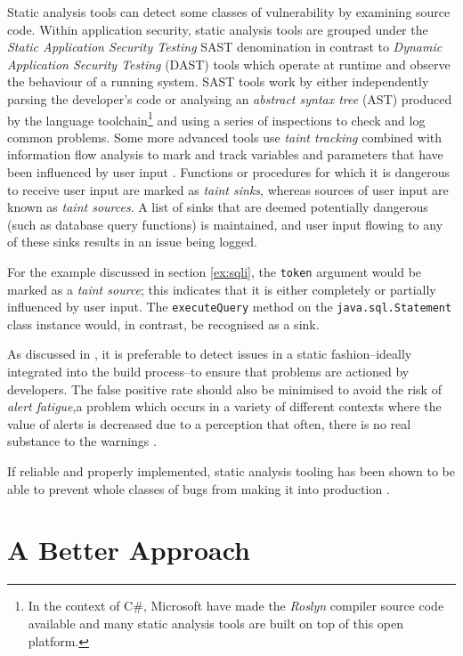 \documentclass[a4paper,openany,12pt]{book}
\begin{document}
Static analysis tools can detect some classes of vulnerability by examining source code.
Within application security, static analysis tools are grouped under the \emph{Static Application Security Testing} SAST
denomination in contrast to \emph{Dynamic Application Security Testing} (DAST) tools which operate at runtime and
observe the behaviour of a running system.
SAST tools work by either independently parsing the developer's code or
analysing an \emph{abstract syntax tree} (AST) produced by the language toolchain\footnote{%
    In the context of C\#, Microsoft have made the \emph{Roslyn} compiler source code available and many static analysis
    tools are built on top of this open platform.}
and using a series of inspections to check and log common problems.
Some more advanced tools use \emph{taint tracking} combined with information flow analysis to mark and track variables
and parameters that have been influenced by user input \citep{denning1977certification}.
Functions or procedures for which it is dangerous to receive user input are marked as \emph{taint sinks}, whereas
sources of user input are known as \emph{taint sources}.
A list of sinks that are deemed potentially dangerous (such as database query functions) is maintained, and user input
flowing to any of these sinks results in an issue being logged.

For the example discussed in section \ref{ex:sqli}, the \texttt{token} argument would be marked as a
\emph{taint source}; this indicates that it is either completely or partially influenced by user input.
The \texttt{executeQuery} method on the \texttt{java.sql.Statement} class instance would, in contrast, be recognised
as a sink.

As discussed in \citet{sadowski2018lessons}, it is preferable to detect issues in a static fashion--ideally integrated
into the build process--to ensure that problems are actioned by developers.
The false positive rate should also be minimised to avoid the risk of \emph{alert fatigue},a problem which occurs in a
variety of different contexts where the value of alerts is decreased due to a perception that often, there is no real
substance to the warnings \citep{kesselheim2011clinical}.

If reliable and properly implemented, static analysis tooling has been shown to be able to prevent whole classes of
bugs from making it into production \citep{sadowski2018lessons}.

\section{A Better Approach}
\end{document}
